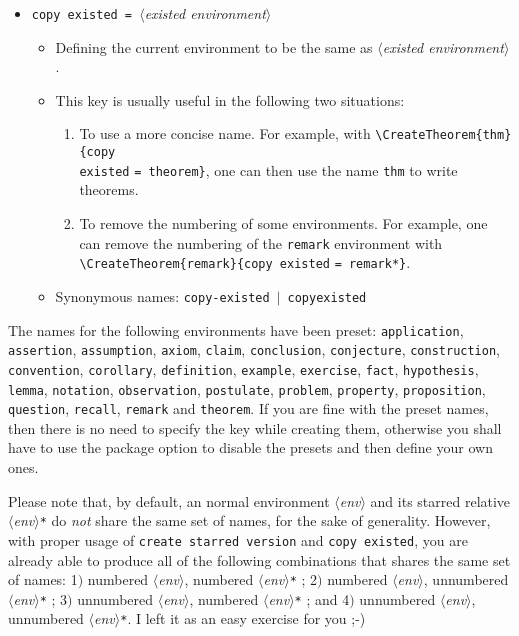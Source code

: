 \documentclass[classical]{einfart}
\newcommand{\meta}[1]{$\langle${\normalfont\itshape#1}$\rangle$}
\newcommand{\packageoption}[1]{\texttt{\textcolor{code-option}{#1}}}
\newcommand{\commandoption}[1]{\texttt{\textcolor{code-keys}{#1}}}
\newenvironment{tip}[1][Tip]
  {%
    \LocallyStopLineNumbers%
    \begin{tcolorbox}[breakable,
        enhanced,
        width = \textwidth,
        colback = paper, colbacktitle = paper,
        colframe = gray!50, boxrule=0.2mm,
        coltitle = black,
        fonttitle = \sffamily,
        attach boxed title to top left = {yshift=-\tcboxedtitleheight/2, xshift=.5cm},
        boxed title style = {boxrule=0pt, colframe=paper},
        before skip = 3mm,
        after skip = 3mm,
        top = 2.5mm,
        bottom = 1.5mm,
        title={\scshape\sffamily #1}]%
  }
  {%
    \end{tcolorbox}%
    \ResumeLineNumbers%
  }
\begin{document}
\begin{itemize}[label=,leftmargin=1.25em,itemindent=-1.25em]
\begin{itemize}
        \end{itemize}
    \item \commandoption{copy existed}\lstinline| = |\meta{existed environment}
        \begin{itemize}
            \item Defining the current environment to be the same as \meta{existed environment}.
\clearpage
            \item This key is usually useful in the following two situations:
                \begin{enumerate}
                    \item To use a more concise name. For example, with \lstinline|\CreateTheorem{thm}{|\commandoption{copy \\existed} \lstinline|= theorem}|, one can then use the name \texttt{thm} to write theorems.
                    \item To remove the numbering of some environments. For example, one can remove the numbering of the \texttt{remark} environment with \lstinline|\CreateTheorem{remark}{|\commandoption{copy existed} \lstinline|= remark*}|.
                \end{enumerate}
            \item Synonymous names: \commandoption{copy-existed} \,$|$\, \commandoption{copyexisted}
        \end{itemize}
\end{itemize}

\begin{tip}
    The names for the following environments have been preset: \texttt{application}, \texttt{assertion}, \texttt{assumption}, \texttt{axiom}, \texttt{claim}, \texttt{conclusion}, \texttt{conjecture}, \texttt{construction}, \texttt{convention}, \texttt{corollary}, \texttt{definition}, \texttt{example}, \texttt{exercise}, \texttt{fact}, \texttt{hypothesis}, \texttt{lemma}, \texttt{notation}, \texttt{observation}, \texttt{postulate}, \texttt{problem}, \texttt{property}, \texttt{proposition}, \texttt{question}, \texttt{recall}, \texttt{remark} and \texttt{theorem}. If you are fine with the preset names, then there is no need to specify the key \textquote{\commandoption{name}} while creating them, otherwise you shall have to use the package option \textquote{\packageoption{no preset names}} to disable the presets and then define your own ones.
\end{tip}

\medskip

Please note that, by default, an normal environment \meta{env} and its starred relative \meta{env}\texttt{*} do \emph{not} share the same set of names, for the sake of generality. However, with proper usage of \commandoption{create starred version} and \commandoption{copy existed}, you are already able to produce all of the following combinations that shares the same set of names: 1$)$ numbered \meta{env}, numbered \meta{env}\texttt{*} ; 2$)$ numbered \meta{env}, unnumbered \meta{env}\texttt{*} ; 3$)$ unnumbered \meta{env}, numbered \meta{env}\texttt{*} ; and 4$)$ unnumbered \meta{env}, unnumbered \meta{env}\texttt{*}. I left it as an easy exercise for you ;-)
\end{document}
